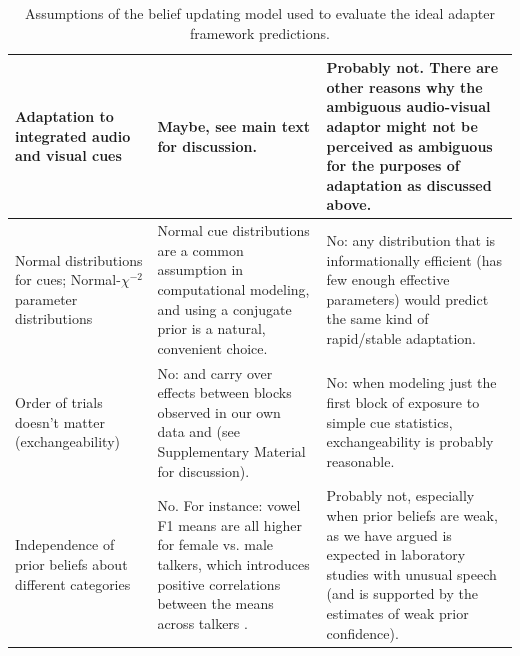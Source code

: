 \begin{table}
\begin{tabular}{p{} | p{} | p{}}
\\ \hline
Adaptation to integrated audio and visual cues
  &  Maybe, see main text for discussion. %
  &  Probably not.  There are other reasons why the ambiguous audio-visual adaptor might not be perceived as ambiguous for the purposes of adaptation as discussed above.%
\\ \hline
Normal distributions for cues; Normal-$\chi^{-2}$ parameter distributions
  &  Normal cue distributions are a common assumption in computational modeling, and using a conjugate prior is a natural, convenient choice.
  &  No: any distribution that is informationally efficient (has few enough effective parameters) would predict the same kind of rapid/stable adaptation.
\\ \hline
Order of trials doesn't matter (exchangeability)
  &  No: \textcite{Kraljic2008a} and carry over effects between blocks observed in our own data and \textcite{Vroomen2007} (see Supplementary Material for discussion).%
  &  No: when modeling just the first block of exposure to simple cue statistics, exchangeability is probably reasonable.
\\ \hline
Independence of prior beliefs about different categories
  &  No.  For instance: vowel F1 means are all higher for female vs. male talkers, which introduces positive correlations between the means across talkers \autocite{Hillenbrand1995}.
  &  Probably not, especially when prior beliefs are weak, as we have argued is expected in laboratory studies with unusual speech (and is supported by the estimates of weak prior confidence).
\\ \hline
  \end{tabular}
  \caption{Assumptions of the belief updating model used to evaluate the ideal adapter framework predictions.}
  \label{tab:model-assumptions}
\end{table}
